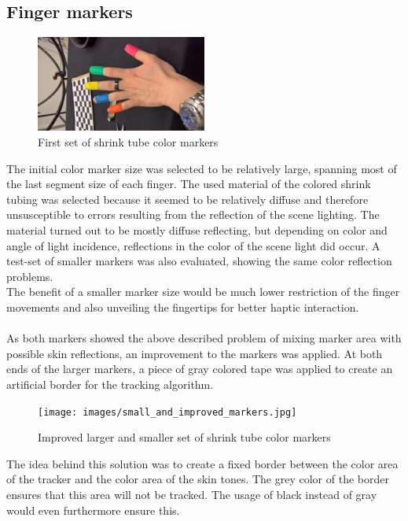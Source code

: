 \subsection{Finger markers}
\begin{figure} 
\centering
\includegraphics[width=0.5\textwidth,angle=-90]{images/color_markers_hand.jpg}
\caption{First set of shrink tube color markers }
\label{img:first_set_color_markers}
\end{figure}
The initial color marker size was selected to be relatively large, spanning most of the last segment size of each finger.
The used material of the colored shrink tubing was selected because it seemed to be relatively diffuse and therefore unsusceptible to errors resulting from the reflection of the scene lighting. The material turned out to be mostly diffuse reflecting, but depending on color and angle of light incidence, reflections in the color of the scene light did occur. A test-set of smaller markers was also evaluated, showing the same color reflection problems.\\The benefit of a smaller marker size would be much lower restriction of the finger movements and also unveiling the fingertips for better haptic interaction.
\\\\As both markers showed the above described problem of mixing marker area with possible skin reflections, an improvement to the markers was applied. At both ends of the larger markers, a piece of gray colored tape was applied to create an artificial border for the tracking algorithm.
\begin{figure}[H]
\centering
\texttt{[image: images/small\_and\_improved\_markers.jpg]}
\caption{Improved larger and smaller set of shrink tube color markers }
\label{img:second_color_markers}
\end{figure}
The idea behind this solution was to create a fixed border between the color area of the tracker and the color area of the skin tones. The grey color of the border ensures that this area will not be tracked. The usage of black instead of gray would even furthermore ensure this. 
